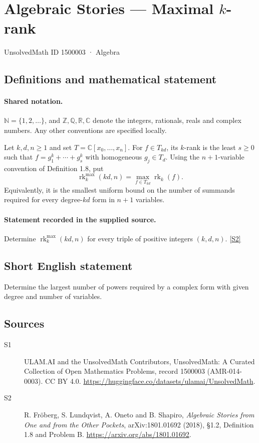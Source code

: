 \documentclass[11pt]{article}
\newcommand{\sref}[2]{\hyperlink{source:#1:#2}{[S#2]}}
\begin{document}
\setcounter{section}{1500002}
\section{Algebraic Stories — Maximal $k$-rank}\label{1500003}
{\small\sffamily UnsolvedMath ID 1500003 · Algebra}
\subsection{Definitions and mathematical statement}

\paragraph{Shared notation.}$\mathbb N=\{1,2,\ldots\}$, and $\mathbb Z,\mathbb Q,\mathbb R,\mathbb C$ denote the integers, rationals, reals and complex numbers. Any other conventions are specified locally.


Let $k,d,n\geq1$ and set $T=\mathbb C[x_0,\ldots,x_n]$. For $f\in T_{kd}$, its $k$-rank is the least $s\geq0$ such that $f=g_1^k+\cdots+g_s^k$ with homogeneous $g_j\in T_d$. Using the $n+1$-variable convention of Definition 1.8, put
\[\operatorname{rk}^{\max}_k(kd,n)=\max_{f\in T_{kd}}\operatorname{rk}_k(f).
\]
Equivalently, it is the smallest uniform bound on the number of summands required for every degree-$kd$ form in $n+1$ variables.
\paragraph{Statement recorded in the supplied source.}
Determine $\operatorname{rk}^{\max}_k(kd,n)$ for every triple of positive integers $(k,d,n)$. \sref{1500003}{2}
\subsection{Short English statement}
Determine the largest number of powers required by a complex form with given degree and number of variables.
\subsection{Sources}
\begin{description}
\item[\hypertarget{source:1500003:1}{S1}] ULAM.AI and the UnsolvedMath Contributors, UnsolvedMath: A Curated Collection of Open Mathematics Problems, record 1500003 (AMR-014-0003). CC BY 4.0. \url{https://huggingface.co/datasets/ulamai/UnsolvedMath}.
\item[\hypertarget{source:1500003:2}{S2}] R. Fröberg, S. Lundqvist, A. Oneto and B. Shapiro, \emph{Algebraic Stories from One and from the Other Pockets}, arXiv:1801.01692 (2018), §1.2, Definition 1.8 and Problem B. \url{https://arxiv.org/abs/1801.01692}.
\end{description}
\label{end:1500003}
\end{document}
